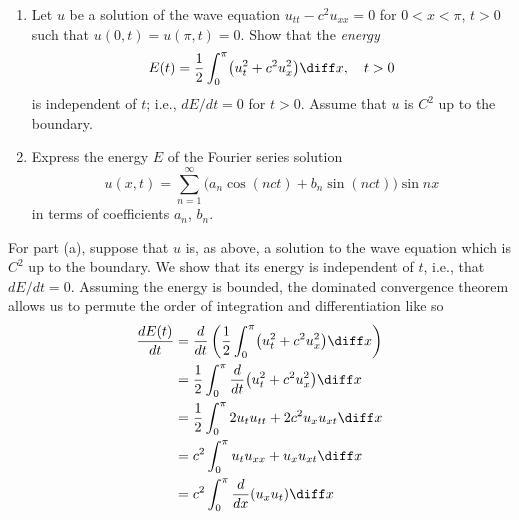 \begin{problem}
  \begin{enumerate}[label=(\alph*),noitemsep]
  \item Let \(u\) be a solution of the wave equation \(u_{tt}-c^2u_{xx}=0\)
    for \(0<x<\pi\), \(t>0\) such that \(u(0,t)=u(\pi,t)=0\). Show that the
    \emph{energy}
    \[
      E(t)=\frac{1}{2}\int_0^\pi \bigl(u_t^2+c^2u_x^2 \bigr)\diff x,\quad t>0
    \]
    is independent of \(t\); i.e., \(dE/dt=0\) for \(t>0\). Assume that
    \(u\) is \(C^2\) up to the boundary.
  \item Express the energy \(E\) of the Fourier series solution
    \[
      u(x,t)=\sum_{n=1}^\infty \bigl(a_n\cos(nct)+b_n\sin(nct)\bigr)\sin nx
    \]
    in terms of coefficients \(a_n\), \(b_n\).
  \end{enumerate}
\end{problem}
\begin{solution}
  For part (a), suppose that \(u\) is, as above, a solution to the wave
  equation which is \(C^2\) up to the boundary. We show that its energy is
  independent of \(t\), i.e., that \(dE/dt=0\). Assuming the energy is
  bounded, the dominated convergence theorem allows us to permute the order
  of integration and differentiation like so
  \begin{align*}
    \frac{dE(t)}{dt}%
    &=\frac{d}{dt}\left(\frac{1}{2}\int_0^\pi
      \bigl(u_t^2+c^2u_x^2\bigr)\diff x\right)\\
    &=\frac{1}{2}\int_0^\pi\frac{d}{dt}\bigl(u_t^2+c^2u_x^2\bigr)\diff x\\
    &=\frac{1}{2}\int_0^\pi 2u_tu_{tt}+2c^2u_xu_{xt}\diff x\\
    &=c^2\int_0^\pi u_tu_{xx}+u_xu_{xt}\diff x\\
    &=c^2\int_0^\pi\frac{d}{dx}(u_xu_t)\diff x
  \end{align*}
\end{solution}


